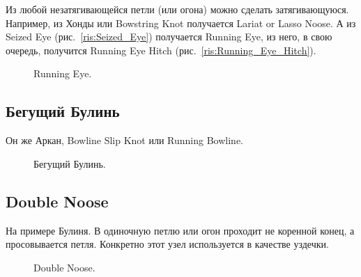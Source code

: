 Из любой незатягивающейся петли (или огона) можно сделать затягивающуюся. Например, из Хонды или Bowstring Knot получается Lariat or Lasso Noose. А из Seized Eye (рис.~\ref{ris:Seized_Eye}) получается Running Eye, из него, в свою очередь, получится Running Eye Hitch (рис.~\ref{ris:Running_Eye_Hitch}).

\begin{figure}[H]\centering
	\begin{minipage}{1\linewidth}
		\begin{center}
			\tcbox[enhanced jigsaw,colframe=black,opacityframe=0.5,opacityback=0.5]
			{\centering{}}
		\end{center}
	\end{minipage}
\caption{Running Eye.}
\label{ris:Running_Eye}
\end{figure}

\subsection{Бегущий Булинь}

Он же Аркан, Bowline Slip Knot или Running Bowline.

\begin{figure}[H]\centering
	\begin{minipage}{1\linewidth}
		\begin{center}
			\tcbox[enhanced jigsaw,colframe=black,opacityframe=0.5,opacityback=0.5]
			{\centering{}}
		\end{center}
	\end{minipage}
\caption{Бегущий Булинь.}
\label{ris:Bowline_Slip_Knot_Linfit_way}
\end{figure}

\subsection{Double Noose}

На примере Булиня. В одиночную петлю или огон проходит не коренной конец, а просовывается петля. Конкретно этот узел используется в качестве уздечки.

\begin{figure}[H]\centering
	\begin{minipage}{1\linewidth}
		\begin{center}
			\tcbox[enhanced jigsaw,colframe=black,opacityframe=0.5,opacityback=0.5]
			{\centering{}}
		\end{center}
	\end{minipage}
\caption{Double Noose.}
\label{ris:Double_Noose}
\end{figure}

